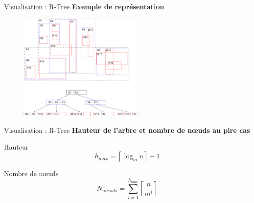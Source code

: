\documentclass[frames,pdf,slideColor,colorBG,accumulate,total]{prosper}
\begin{document}
  \begin{slide}[Box]{Visualisation : R-Tree}
          \textbf{Exemple de représentation}
      \begin{figure}[t]

        \begin{center}
          \includegraphics[width=0.55\textwidth]{img/rtree}
        \end{center}
      \end{figure}
  \end{slide}

  \begin{slide}[Box]{Visualisation : R-Tree}
      \textbf{Hauteur de l'arbre et nombre de nœuds au pire cas}
    \begin{Itemize}
    \item Hauteur
      \begin{equation*}
        h_{max} = \left\lceil\log_{m} n\right\rceil - 1
      \end{equation*}
      \item Nombre de nœuds
      \begin{equation*}
        N_{noeuds}=\sum_{i=1}^{h_{max}}{\left\lceil\frac{n}{m^i}\right\rceil}
      \end{equation*}
    \end{Itemize}
  \end{slide}
\end{document}
